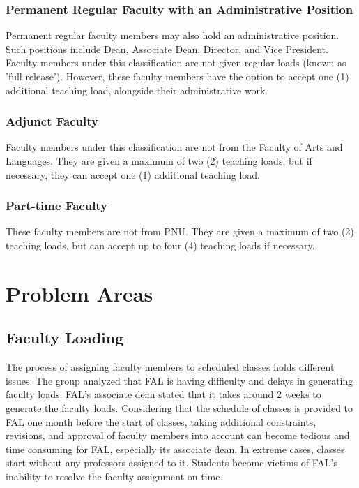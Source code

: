 \subsubsection{Permanent Regular Faculty with an Administrative Position}
Permanent regular faculty members may also hold an administrative position. Such positions include Dean, Associate Dean, Director, and Vice President. Faculty members under this classification are not given regular loads (known as 'full release'). However, these faculty members have the option to accept one (1) additional teaching load, alongside their administrative work.

\subsubsection{Adjunct Faculty}
Faculty members under this classification are not from the Faculty of Arts and Languages. They are given a maximum of two (2) teaching loads, but if necessary, they can accept one (1) additional teaching load.

\subsubsection{Part-time Faculty}
These faculty members are not from PNU. They are given a maximum of two (2) teaching loads, but can accept up to four (4) teaching loads if necessary.

\section{Problem Areas}

\subsection{Faculty Loading}
The process of assigning faculty members to scheduled classes holds different issues. The group analyzed that FAL is having difficulty and delays in generating faculty loads. FAL’s associate dean stated that it takes around 2 weeks to generate the faculty loads. Considering that the schedule of classes is provided to FAL one month before the start of classes, taking additional constraints, revisions, and approval of faculty members into account can become tedious and time consuming for FAL, especially its associate dean. In extreme cases, classes start without any professors assigned to it. Students become victims of FAL’s inability to resolve the faculty assignment on time.

